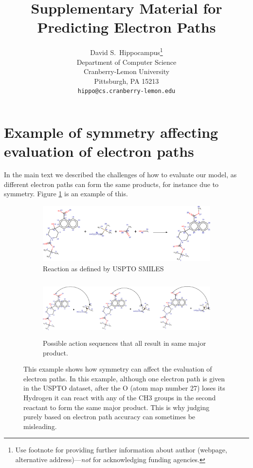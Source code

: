 \documentclass{article}
\title{Supplementary Material for Predicting Electron Paths}
\author{
  David S.~Hippocampus\thanks{Use footnote for providing further
    information about author (webpage, alternative
    address)---\emph{not} for acknowledging funding agencies.} \\
  Department of Computer Science\\
  Cranberry-Lemon University\\
  Pittsburgh, PA 15213 \\
  \texttt{hippo@cs.cranberry-lemon.edu} \\
}
\begin{document}
\maketitle


\section{Example of symmetry affecting evaluation of electron paths}
In the main text we described the challenges of how to evaluate our model, as different electron paths can form the same products, for instance due to symmetry.
Figure \ref{fig:symmetric-reaction-example} is an example of this.


\begin{figure}[h]

    \centering
    \begin{subfigure}[b]{0.95\textwidth}
        \centering
        \includegraphics[height=1.2in]{imgs/reaction}
        \caption{Reaction as defined by USPTO SMILES}
    \end{subfigure}
    
    \par\bigskip %
    \begin{subfigure}[b]{0.95\textwidth}
        \centering
        \includegraphics[height=1.2in]{imgs/routes}
        \caption{Possible action sequences that all result in same major product.}
    \end{subfigure}
    \caption{This example shows how symmetry can affect the evaluation of electron paths. In this example, although one electron path is given in the USPTO dataset, after the O (atom map number 27) loses its Hydrogen it can react with any of the CH3 groups in the second reactant to form the same major product. This is why judging purely based on electron path accuracy can sometimes be misleading.}
    \label{fig:symmetric-reaction-example}
\end{figure}
\end{document}

